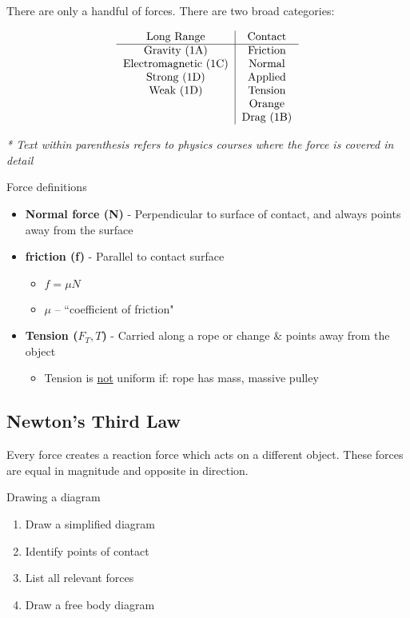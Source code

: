 \documentclass{article}
\begin{document}
There are only a handful of forces. There are two broad categories:

\begin{equation*}
    \begin{tabular}{ c | c }
        Long Range & Contact \\
        \hline
        Gravity (1A) & Friction \\
        Electromagnetic (1C) & Normal \\
        Strong (1D) & Applied \\
        Weak (1D) & Tension \\
                  & Orange \\
                  & Drag (1B)
    \end{tabular}
\end{equation*}

\textit{* Text within parenthesis refers to physics courses where the force is covered in detail}

Force definitions
\begin{itemize}
    \item \textbf{Normal force (N)} - Perpendicular to surface of contact, and always points away from the surface
    \item \textbf{friction (f)} - Parallel to contact surface
        \begin{itemize}
            \item $ f = \mu N $
            \item $ \mu $ – ``coefficient of friction"
        \end{itemize}
    \item \textbf{Tension ($ F_{T},T $)} - Carried along a rope or change \& points away from the object
        \begin{itemize}
            \item Tension is \underline{not} uniform if: rope has mass, massive pulley
        \end{itemize}
\end{itemize}

\subsection{Newton's Third Law}

Every force creates a reaction force which acts on a different object. These forces are equal in magnitude and opposite in direction.

Drawing a diagram
\begin{enumerate}
    \item Draw a simplified diagram
    \item Identify points of contact
    \item List all relevant forces
    \item Draw a free body diagram
\end{enumerate}
\end{document}

